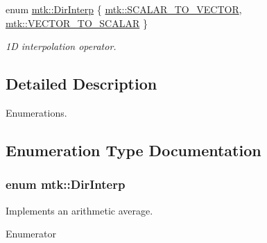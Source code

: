 \begin{DoxyCompactItemize}
enum \hyperlink{group__c02-enums_ga674ec67bd1baa04e5dc06c2bcc351972}{mtk\-::\-Dir\-Interp} \{ \hyperlink{group__c02-enums_ga674ec67bd1baa04e5dc06c2bcc351972abc9e2b8cd5a497c9f3252a792e356139}{mtk\-::\-S\-C\-A\-L\-A\-R\-\_\-\-T\-O\-\_\-\-V\-E\-C\-T\-O\-R}, 
\hyperlink{group__c02-enums_ga674ec67bd1baa04e5dc06c2bcc351972a122cf2e24aef105e9214698206af6904}{mtk\-::\-V\-E\-C\-T\-O\-R\-\_\-\-T\-O\-\_\-\-S\-C\-A\-L\-A\-R}
 \}
\begin{DoxyCompactList}\small\item\em 1\-D interpolation operator. \end{DoxyCompactList}\end{DoxyCompactItemize}


\subsection{Detailed Description}
Enumerations. 

\subsection{Enumeration Type Documentation}
\hypertarget{group__c02-enums_ga674ec67bd1baa04e5dc06c2bcc351972}{
\subsubsection[{Dir\-Interp}]{\setlength{\rightskip}{0pt plus 5cm}enum {\bf mtk\-::\-Dir\-Interp}}}\label{group__c02-enums_ga674ec67bd1baa04e5dc06c2bcc351972}
Implements an arithmetic average. \begin{Desc}
\item[Enumerator]\par
\begin{description}
\item[{\em 
\hypertarget{group__c02-enums_ga674ec67bd1baa04e5dc06c2bcc351972abc9e2b8cd5a497c9f3252a792e356139}{S\-C\-A\-L\-A\-R\-\_\-\-T\-O\-\_\-\-V\-E\-C\-T\-O\-R}\label{group__c02-enums_ga674ec67bd1baa04e5dc06c2bcc351972abc9e2b8cd5a497c9f3252a792e356139}
}]\item[{\em 
\hypertarget{group__c02-enums_ga674ec67bd1baa04e5dc06c2bcc351972a122cf2e24aef105e9214698206af6904}{V\-E\-C\-T\-O\-R\-\_\-\-T\-O\-\_\-\-S\-C\-A\-L\-A\-R}\label{group__c02-enums_ga674ec67bd1baa04e5dc06c2bcc351972a122cf2e24aef105e9214698206af6904}
}]\end{description}
\end{Desc}


